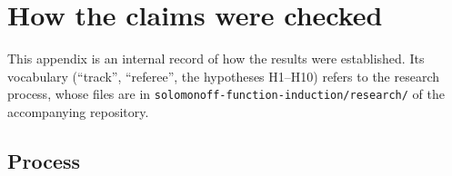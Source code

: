 \section{How the claims were checked}\label{app:verification}

This appendix is an internal record of how the results were established. Its vocabulary (``track'', ``referee'', the hypotheses H1--H10) refers to the research process, whose files are in \texttt{solomonoff-function-induction/research/} of the accompanying repository.

\subsection{Process}\label{app:verification:process}


